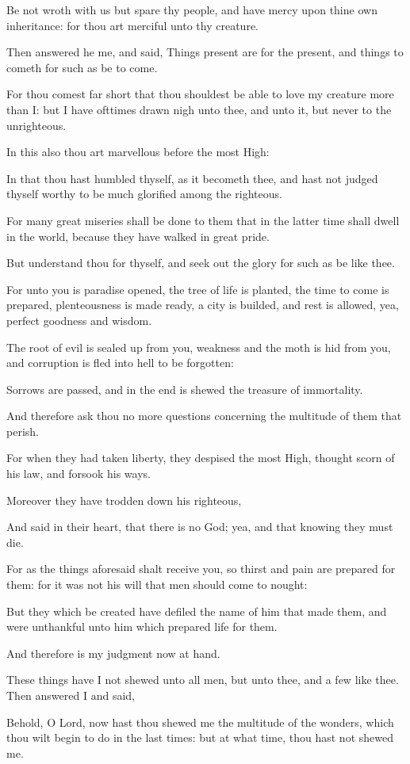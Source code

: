 {\par }{\PP {}Be not wroth with us but spare thy people, and have mercy upon thine own inheritance: for thou art merciful unto thy creature.
\par }{\PP {}Then answered he me, and said, Things present are for the present, and things to cometh for such as be to come.
\par }{\PP {}For thou comest far short that thou shouldest be able to love my creature more than I: but I have ofttimes drawn nigh unto thee, and unto it, but never to the unrighteous.
\par }{\PP {}In this also thou art marvellous before the most High:
\par }{\PP {}In that thou hast humbled thyself, as it becometh thee, and hast not judged thyself worthy to be much glorified among the righteous.
\par }{\PP {}For many great miseries shall be done to them that in the latter time shall dwell in the world, because they have walked in great pride.
\par }{\PP {}But understand thou for thyself, and seek out the glory for such as be like thee.
\par }{\PP {}For unto you is paradise opened, the tree of life is planted, the time to come is prepared, plenteousness is made ready, a city is builded, and rest is allowed, yea, perfect goodness and wisdom.
\par }{\PP {}The root of evil is sealed up from you, weakness and the moth is hid from you, and corruption is fled into hell to be forgotten:
\par }{\PP {}Sorrows are passed, and in the end is shewed the treasure of immortality.
\par }{\PP {}And therefore ask thou no more questions concerning the multitude of them that perish.
\par }{\PP {}For when they had taken liberty, they despised the most High, thought scorn of his law, and forsook his ways.
\par }{\PP {}Moreover they have trodden down his righteous,
\par }{\PP {}And said in their heart, that there is no God; yea, and that knowing they must die.
\par }{\PP {}For as the things aforesaid shalt receive you, so thirst and pain are prepared for them: for it was not his will that men should come to nought:
\par }{\PP {}But they which be created have defiled the name of him that made them, and were unthankful unto him which prepared life for them.
\par }{\PP {}And therefore is my judgment now at hand.
\par }{\PP {}These things have I not shewed unto all men, but unto thee, and a few like thee. Then answered I and said,
\par }{\PP {}Behold, O Lord, now hast thou shewed me the multitude of the wonders, which thou wilt begin to do in the last times: but at what time, thou hast not shewed me.

}
